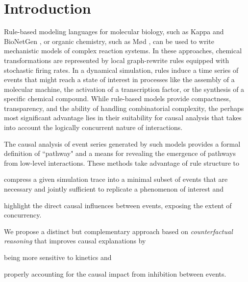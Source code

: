 
\section*{Introduction}\label{sec:intro}

Rule-based modeling languages for molecular biology, such as Kappa
\cite{DanosEtAl-CONCUR07} and BioNetGen \cite{bngl}, or organic
chemistry, such as M{\o}d \cite{moll}, can be used to write
mechanistic models of complex reaction systems. In these approaches,
chemical transformations are represented by local graph-rewrite rules
equipped with stochastic firing rates. In a dynamical simulation,
rules induce a time series of events that might reach a state of
interest in processes like the assembly of a molecular machine, the
activation of a transcription factor, or the synthesis of a specific
chemical compound. While rule-based models provide compactness,
transparency, and the ability of handling combinatorial complexity,
the perhaps most significant advantage lies in their suitability for
causal analysis that takes into account the logically concurrent
nature of interactions.



The causal analysis
\cite{DBLP:conf/fsttcs/DanosFFHH12,DanosEtAl-CONCUR07} of event series
generated by such models provides a formal definition of ``pathway"
and a means for revealing the emergence of pathways from low-level
interactions. These methods take advantage of rule structure to
\begin{inparaenum}[(i)]
\item compress a given simulation trace into a minimal subset of
  events that are necessary and jointly sufficient to replicate a
  phenomenon of interest and
\item highlight the direct causal influences between events, exposing
  the extent of concurrency.
\end{inparaenum}


We propose a distinct but complementary approach based on
\textit{counterfactual reasoning} that improves causal explanations by
\begin{inparaenum}[(i)]
\item being more sensitive to kinetics and
\item properly accounting for the causal impact from inhibition
  between events.
\end{inparaenum}